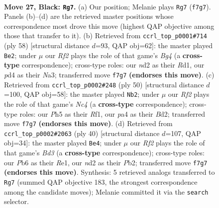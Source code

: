 \documentclass[11pt]{article}
\begin{document}
\clearpage

\begin{figure}[p]\centering
\begin{subfigure}{0.46\textwidth}\centering
\resizebox{\linewidth}{!}{%
\newchessgame
\chessboard[
  setfen={3rbbn1/p1k2r2/1p2p1p1/nP1pP1Pp/P2P1P2/6K1/3N4/RNB2B1R b - - 9 27},
  showmover=false,
  pgfstyle=straightmove, color=movearrow, markmove={f7-g7}
]}
\caption{}
\end{subfigure}\hfill
\begin{subfigure}{0.46\textwidth}\centering
\resizebox{\linewidth}{!}{%
\newchessgame
\chessboard[
  setfen={4r3/3r1k2/bpp1pp1p/p2n2pP/P2P2B1/N1P3P1/1P3P2/3RR1K1 w - - 2 30},
  showmover=false,
  pgfstyle=straightmove, color=movearrow, markmove={g4-e2}
]}
\caption{}
\end{subfigure}
\\[4pt]
\begin{subfigure}{0.46\textwidth}\centering
\resizebox{\linewidth}{!}{%
\newchessgame
\chessboard[
  setfen={3r1b2/1bk4r/pp6/2pnPp2/P1N2Ppp/2PP4/2NBK1PP/1R3R2 w - - 2 26},
  showmover=false,
  pgfstyle=straightmove, color=movearrow, markmove={c4-b2}
]}
\caption{}
\end{subfigure}\hfill
\begin{subfigure}{0.46\textwidth}\centering
\resizebox{\linewidth}{!}{%
\newchessgame
\chessboard[
  setfen={b3k2r/2rp1pp1/p3p3/N2nP2p/Pp3P2/3B4/1PP3PP/1K1RR3 w k - 3 21},
  showmover=false,
  pgfstyle=straightmove, color=movearrow, markmove={d3-e4}
]}
\caption{}
\end{subfigure}
\caption{\textbf{Move 27, Black: \texttt{Rg7}.} (a) Our position; Melanie plays \texttt{Rg7} (\texttt{f7g7}). Panels (b)--(d) are the retrieved master positions whose correspondence most drove this move (highest QAP objective among those that transfer to it). (b) Retrieved from \texttt{ccrl\_top\_p0001\#714} (ply 58) [structural distance $d$=93, QAP obj=62]: the master played \texttt{Be2}; under $\mu$ our \emph{Rf2} plays the role of that game's \emph{Bg4} (a \textbf{cross-type} correspondence); cross-type roles: our \emph{n}d2 as their \emph{R}d1, our \emph{p}d4 as their \emph{N}a3; transferred move \texttt{f7g7} \textbf{(endorses this move)}. (c) Retrieved from \texttt{ccrl\_top\_p0002\#248} (ply 50) [structural distance $d$=100, QAP obj=58]: the master played \texttt{Nb2}; under $\mu$ our \emph{Rf2} plays the role of that game's \emph{Nc4} (a \textbf{cross-type} correspondence); cross-type roles: our \emph{P}h5 as their \emph{R}f1, our \emph{p}a4 as their \emph{B}d2; transferred move \texttt{f7g7} \textbf{(endorses this move)}. (d) Retrieved from \texttt{ccrl\_top\_p0002\#2063} (ply 40) [structural distance $d$=107, QAP obj=34]: the master played \texttt{Be4}; under $\mu$ our \emph{Rf2} plays the role of that game's \emph{Bd3} (a \textbf{cross-type} correspondence); cross-type roles: our \emph{P}b6 as their \emph{R}e1, our \emph{n}d2 as their \emph{P}b2; transferred move \texttt{f7g7} \textbf{(endorses this move)}. Synthesis: 5 retrieved analogs transferred to \texttt{Rg7} (summed QAP objective 183, the strongest correspondence among the candidate moves); Melanie committed it via the \texttt{search} selector.}
\label{fig:thought-m53}
\end{figure}
\end{document}
